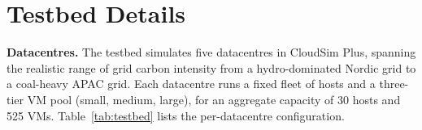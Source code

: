 \appendix
\section{Testbed Details}
\label{app:testbed}

\textbf{Datacentres.} The testbed simulates five datacentres in CloudSim Plus, spanning the realistic range of grid carbon intensity from a hydro-dominated Nordic grid to a coal-heavy APAC grid. Each datacentre runs a fixed fleet of hosts and a three-tier VM pool (small, medium, large), for an aggregate capacity of 30 hosts and 525 VMs. Table~\ref{tab:testbed} lists the per-datacentre configuration.

